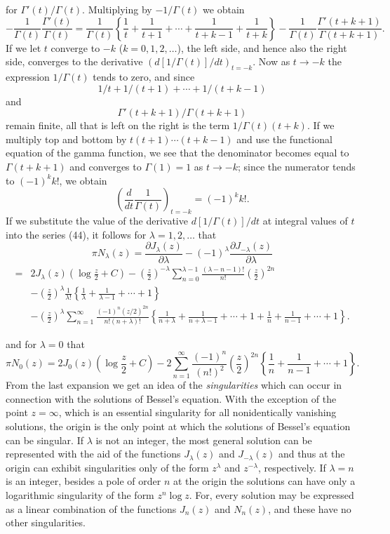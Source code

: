 for $\Gamma'(t)/\Gamma(t)$. Multiplying by $-1/\Gamma(t)$ we obtain
\[
-\frac1{\Gamma(t)}\frac{\Gamma'(t)}{\Gamma(t)}
=\frac1{\Gamma(t)}\left\{\frac1t+\frac1{t+1}+\cdots+\frac1{t+k-1}+\frac1{t+k}\right\}
-\frac1{\Gamma(t)}\frac{\Gamma'(t+k+1)}{\Gamma(t+k+1)}.
\]
If we let $t$ converge to $-k$ ($k=0,1,2,\ldots$), the left side, and hence also the right side, converges to the derivative $(d[1/\Gamma(t)]/dt)_{t=-k}$. Now as $t\to-k$ the expression $1/\Gamma(t)$ tends to zero, and since
\[
1/t+1/(t+1)+\cdots+1/(t+k-1)
\]
and
\[
\Gamma'(t+k+1)/\Gamma(t+k+1)
\]
remain finite, all that is left on the right is the term $1/\Gamma(t)(t+k)$. If we multiply top and bottom by $t(t+1)\cdots(t+k-1)$ and use the functional equation of the gamma function, we see that the denominator becomes equal to $\Gamma(t+k+1)$ and converges to $\Gamma(1)=1$ as $t\to-k$; since the numerator tends to $(-1)^kk!$, we obtain
\[
\left(\frac d{dt}\frac1{\Gamma(t)}\right)_{t=-k}=(-1)^kk!.
\]
If we substitute the value of the derivative $d[1/\Gamma(t)]/dt$ at integral values of $t$ into the series (44), it follows for $\lambda=1,2,\ldots$ that
\[
\pi N_\lambda(z)=\frac{\partial J_\lambda(z)}{\partial\lambda}
-(-1)^\lambda\frac{\partial J_{-\lambda}(z)}{\partial\lambda}
\]
\begin{equation}\tag{45}
\begin{aligned}
={}&2J_\lambda(z)\left(\log\frac z2+C\right)
-\left(\frac z2\right)^{-\lambda}\sum_{n=0}^{\lambda-1}
\frac{(\lambda-n-1)!}{n!}\left(\frac z2\right)^{2n}\\
&-\left(\frac z2\right)^\lambda\frac1{\lambda!}
\left\{\frac1\lambda+\frac1{\lambda-1}+\cdots+1\right\}\\
&-\left(\frac z2\right)^\lambda\sum_{n=1}^{\infty}
\frac{(-1)^n(z/2)^{2n}}{n!(n+\lambda)!}
\left\{\frac1{n+\lambda}+\frac1{n+\lambda-1}+\cdots+1
+\frac1n+\frac1{n-1}+\cdots+1\right\}.
\end{aligned}
\end{equation}

and for $\lambda=0$ that
\[
\pi N_0(z)=2J_0(z)\left(\log\frac z2+C\right)
-2\sum_{n=1}^{\infty}\frac{(-1)^n}{(n!)^2}\left(\frac z2\right)^{2n}
\left\{\frac1n+\frac1{n-1}+\cdots+1\right\}.
\]
From the last expansion we get an idea of the \emph{singularities} which can occur in connection with the solutions of Bessel's equation. With the exception of the point $z=\infty$, which is an essential singularity for all nonidentically vanishing solutions, the origin is the only point at which the solutions of Bessel's equation can be singular. If $\lambda$ is not an integer, the most general solution can be represented with the aid of the functions $J_\lambda(z)$ and $J_{-\lambda}(z)$ and thus at the origin can exhibit singularities only of the form $z^\lambda$ and $z^{-\lambda}$, respectively. If $\lambda=n$ is an integer, besides a pole of order $n$ at the origin the solutions can have only a logarithmic singularity of the form $z^n\log z$. For, every solution may be expressed as a linear combination of the functions $J_n(z)$ and $N_n(z)$, and these have no other singularities.


